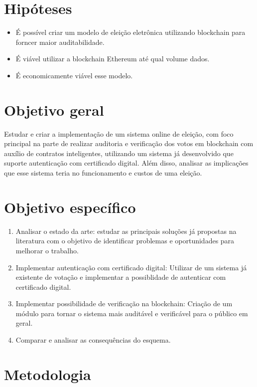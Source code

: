 \documentclass{ufsctex/ufsctex}
\begin{document}
\section{Hipóteses}

\begin{itemize}
	\item É possível criar um modelo de eleição eletrônica utilizando blockchain
		para forncer maior auditabilidade.
	\item É viável utilizar a blockchain Ethereum até qual volume dados.
	\item É economicamente viável esse modelo.
\end{itemize}

\section{Objetivo geral}

Estudar e criar a implementação de um sistema online de eleição, com foco
principal na parte de realizar auditoria e verificação dos votos em blockchain
com auxílio de contratos inteligentes, utilizando um sistema já desenvolvido
que suporte autenticação com certificado digital. Além disso, analisar as implicações
que esse sistema teria no funcionamento e custos de uma eleição. \\

\section{Objetivo específico}

\begin{enumerate}[label=\roman*.]
	\item Analisar o estado da arte: estudar as principais soluções
	já propostas na literatura com o objetivo de identificar problemas
	e oportunidades para melhorar o trabalho.
	\item Implementar autenticação com certificado digital: Utilizar
	de um sistema já existente de votação e implementar a possiblidade
	de autenticar com certificado digital.
	\item Implementar possibilidade de verificação na blockchain:
	Criação de  um módulo para tornar o sistema mais auditável e 
	verificável para o público em geral.
	\item Comparar e analisar as consequências do esquema.
\end{enumerate}

\section{Metodologia}
\end{document}
